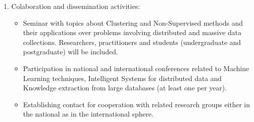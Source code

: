 \documentclass[10pt]{article}
\begin{document}
\begin{enumerate}
    \item Colaboration and dissemination activities:
        \begin{itemize}
            \item Seminar with topics about Clustering and Non-Supervised methods and their applications over problems involving  distributed and massive data collections. Researchers, practitioners and students (undergraduate and postgraduate) will be included. 
            \item Participation in national and international conferences related to Machine Learning techniques, Intelligent Systems for distributed data and Knowledge extraction from large databases (at least one per year).
            \item Establishing contact for cooperation with related research groups either in the national as in the international sphere.
        \end{itemize}
\end{enumerate}
\end{document}
